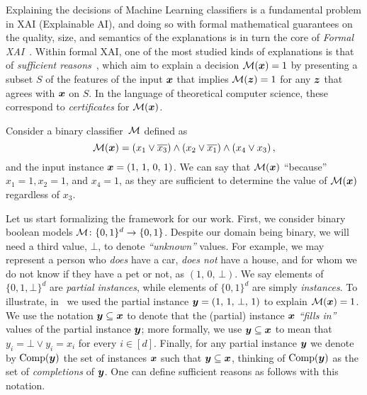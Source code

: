 Explaining the decisions of Machine Learning classifiers is a fundamental problem in XAI (Explainable AI), and doing so with formal mathematical guarantees on the quality, size, and semantics of the explanations is in turn the core of \emph{Formal XAI}~\cite{formal-xai}. 
Within formal XAI, one of the most studied kinds of explanations is that of \emph{sufficient reasons}~\cite{Darwiche_Hirth_2020}, which aim to explain a decision $\mathcal{M}({\bm{x}}) = 1$ by presenting a subset $S$ of the features of the input ${\bm{x}}$ that implies $\mathcal{M}({\bm{z}}) = 1$  for any ${\bm{z}}$ that agrees with ${\bm{x}}$ on $S$. 
In the language of theoretical computer science, these correspond to \emph{certificates} for $\mathcal{M}({\bm{x}})$.

\begin{example}
Consider a binary classifier~$\mathcal{M}$ defined as 
	\[
	\mathcal{M}({\bm{x}}) = \left(x_1 \lor \overline{x_3}\right) \land   \left(x_2 \lor \overline{x_1}\right) \land \left(x_4 \lor x_3\right),
	\]
	and the input instance ${\bm{x}} = \left( 1, \,  1, \, 0, \, 1 \right)$. We can say that $\mathcal{M}({\bm{x}})$ ``because'' $x_1 = 1, x_2 = 1$, and $x_4 = 1$, as they are sufficient to determine the value of $\mathcal{M}({\bm{x}})$ regardless of $x_3$.
	\label{ex:sufficient-reason}
\end{example}

Let us start formalizing the framework for our work.  First, we consider binary boolean models $\mathcal{M}\colon \{0, 1\}^d \to \{0, 1\}$. Despite our domain being binary, we will need a third value, $\bot$, to denote \emph{``unknown''} values.  For example, we may represent a person who \emph{does} have a car, \emph{does not} have a house, and for whom we do not know if they have a pet or not, as $\left(1, \, 0, \, \bot\right)$. 
We say elements of $\{0, 1, \bot\}^d$ are \emph{partial instances}, while elements of $\{0, 1\}^d$ are simply \emph{instances}. To illustrate, in~ we used the partial instance ${\bm{y}} = \left(1, \, 1, \, \bot, \, 1 \right)$ to explain $\mathcal{M}({\bm{x}}) = 1$.
We use the notation ${\bm{y}} \subseteq {\bm{x}}$ to denote that the (partial) instance ${\bm{x}}$ \emph{``fills in''} values of the partial instance ${\bm{y}}$; more formally, we use ${\bm{y}} \subseteq {\bm{x}}$ to mean that $y_i = \bot \lor y_i = x_i$ for every $i \in [d]$. Finally, for any partial instance ${\bm{y}}$ we denote by $\operatorname{Comp}({\bm{y}})$ the set of instances ${\bm{x}}$ such that ${\bm{y}} \subseteq {\bm{x}}$, thinking of $\operatorname{Comp}({\bm{y}})$ as the set of \emph{completions} of ${\bm{y}}$. One can define sufficient reasons as follows with this notation.

